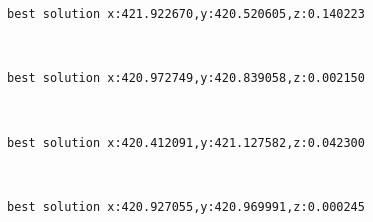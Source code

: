 \documentclass[11pt]{article}
\begin{document}
    \begin{Verbatim}[commandchars=\\\{\}]
best solution x:421.922670,y:420.520605,z:0.140223

    \end{Verbatim}

    \begin{center}
    \end{center}
    { \hspace*{\fill} \\}
    
    \begin{Verbatim}[commandchars=\\\{\}]
best solution x:420.972749,y:420.839058,z:0.002150

    \end{Verbatim}

    \begin{center}
    \end{center}
    { \hspace*{\fill} \\}
    
    \begin{Verbatim}[commandchars=\\\{\}]
best solution x:420.412091,y:421.127582,z:0.042300

    \end{Verbatim}

    \begin{center}
    \end{center}
    { \hspace*{\fill} \\}
    
    \begin{Verbatim}[commandchars=\\\{\}]
best solution x:420.927055,y:420.969991,z:0.000245

    \end{Verbatim}

    \begin{center}
    \end{center}
    { \hspace*{\fill} \\}
    
\end{document}
